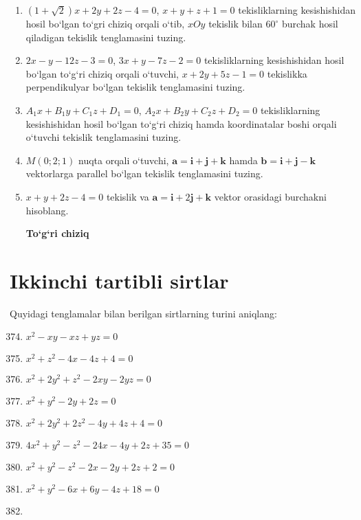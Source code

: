 \begin{enumerate}
	\item $(1+\sqrt{2})x+2y+2z-4=0$, $x+y+z+1=0$ tekisliklarning kesishishidan hosil bo`lgan to`gri chiziq orqali o`tib, $xOy$ tekislik bilan $60^\circ$ burchak hosil qiladigan tekislik tenglamasini tuzing.
	\item $2x-y-12z-3=0$, $3x+y-7z-2=0$ tekisliklarning kesishishidan hosil bo`lgan to`g`ri chiziq orqali o`tuvchi, $x+2y+5z-1=0$ tekislikka perpendikulyar bo`lgan tekislik tenglamasini tuzing.
	\item $A_1x+B_1y+C_1z+D_1=0$, $A_2x+B_2y+C_2z+D_2=0$ tekisliklarning kesishishidan hosil bo`lgan to`g`ri chiziq hamda koordinatalar boshi orqali o`tuvchi tekislik tenglamasini tuzing.
	\item $M(0;2;1)$ nuqta orqali o`tuvchi, $\textbf{a}=\textbf{i}+\textbf{j}+\textbf{k}$ hamda $\textbf{b}=\textbf{i}+\textbf{j}-\textbf{k}$ vektorlarga parallel bo`lgan tekislik tenglamasini tuzing.
	\item $x+y+2z-4=0$ tekislik va $\textbf{a}=\textbf{i}+2\textbf{j}+\textbf{k}$ vektor orasidagi burchakni hisoblang.
	
	\textbf{To`g`ri chiziq}
	

	
	
\end{enumerate}
\section{Ikkinchi tartibli sirtlar}


Quyidagi tenglamalar bilan berilgan sirtlarning turini aniqlang:
\begin{enumerate}\setcounter{enumi}{373}
	\item $x^2-xy-xz+yz=0$
	\item $x^2+z^2-4x-4z+4=0$
	
	\item $x^2+2y^2+z^2-2xy-2yz=0$
	\item $x^2+y^2-2y+2z=0$
	
	\item $x^2+2y^2+2z^2-4y+4z+4=0$
	\item $4x^2+y^2-z^2-24x-4y+2z+35=0$
	
	\item $x^2+y^2-z^2-2x-2y+2z+2=0$
	\item $x^2+y^2-6x+6y-4z+18=0$
	
	\item 
	
	
	
\end{enumerate}
